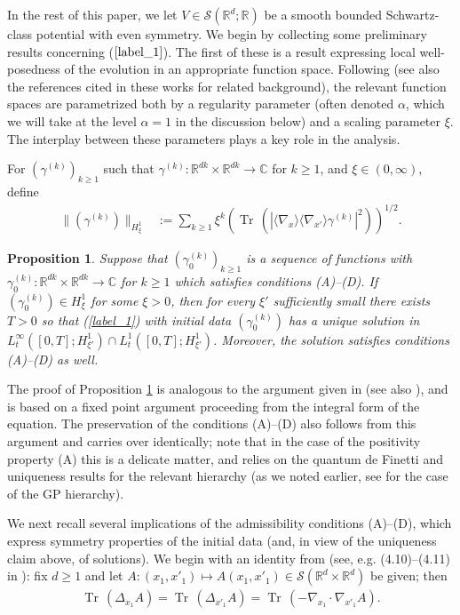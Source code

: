 \documentclass[reqno]{amsart}
\numberwithin{equation}{section}
\newtheorem{proposition}[theorem]{Proposition}
\theoremstyle{remark}
\DeclareMathOperator{\Tr}{Tr\,}
\begin{document}
In the rest of this paper, we let $V\in\mathcal{S}(\mathbb{R}^d;\mathbb{R})$ be a smooth bounded Schwartz-class potential with even symmetry.  We begin by collecting some preliminary results concerning ($\ref{label_1}$).   The first of these is a result expressing local well-posedness of the evolution in an appropriate function space.  Following \cite{CP_Cauchy,CPHigher} (see also the references cited in these works for related background), the relevant function spaces are parametrized both by a regularity parameter (often denoted $\alpha$, which we will take at the level $\alpha=1$ in the discussion below) and a scaling parameter $\xi$.  The interplay between these parameters plays a key role in the analysis.

For $(\gamma^{(k)})_{k\geq 1}$ such that $\gamma^{(k)}:\mathbb{R}^{dk}\times\mathbb{R}^{dk}\rightarrow \mathbb{C}$ for $k\geq 1$, and $\xi\in (0,\infty)$, define
\begin{align*}
\lVert (\gamma^{(k)})\rVert_{H^1_{\xi}}&:=\sum_{k\geq 1} \xi^k\left(\Tr(|\langle\nabla_x\rangle\langle\nabla_{x'}\rangle\gamma^{(k)}|^2)\right)^{1/2}.
\end{align*}

\begin{proposition}
\label{label_prop1}
Suppose that $(\gamma_0^{(k)})_{k\geq 1}$ is a sequence of functions with $\gamma_0^{(k)}:\mathbb{R}^{dk}\times\mathbb{R}^{dk}\rightarrow\mathbb{C}$ for $k\geq 1$ which satisfies conditions (A)--(D).  If $(\gamma_0^{(k)})\in H^1_{\xi}$ for some $\xi>0$, then for every $\xi'$ sufficiently small there exists $T>0$ so that (\ref{label_1}) with initial data $(\gamma_0^{(k)})$ has a unique solution in $L_t^\infty([0,T];H^1_{\xi'})\cap L_t^1([0,T];H^1_{\xi'})$.  Moreover, the solution satisfies conditions (A)--(D) as well.
\end{proposition}

The proof of Proposition \ref{label_prop1} is analogous to the argument given in \cite{CP_Cauchy} (see also \cite{CPHigher}), and is based on a fixed point argument proceeding from the integral form of the equation.  The preservation of the conditions (A)--(D) also follows from this argument and carries over identically; note that in the case of the positivity property (A) this is a delicate matter, and relies on the quantum de Finetti and uniqueness results for the relevant hierarchy (as we noted earlier, see \cite{ChTa} for the case of the GP hierarchy).

We next recall several implications of the admissibility conditions (A)--(D), which express symmetry properties of the initial data (and, in view of the uniqueness claim above, of solutions).  We begin with an identity from \cite{CPT} (see, e.g. (4.10)--(4.11) in \cite{CPT}): fix $d\geq 1$ and let $A:(x_1,x'_1)\mapsto A(x_1,x'_1)\in\mathcal{S}(\mathbb{R}^d\times\mathbb{R}^d)$ be given; then
\begin{align}
\label{label_11}\Tr(\Delta_{x_1}A)=\Tr(\Delta_{x'_1}A)=\Tr(-\nabla_{x_1}\cdot \nabla_{x'_1}A).
\end{align}
\end{document}
